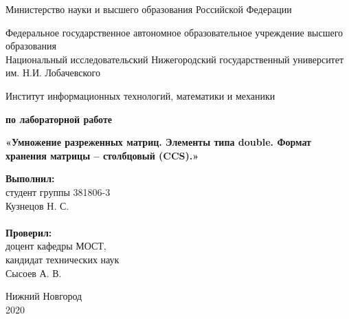 \documentclass{report}
\begin{document}
\begin{titlepage}

\begin{center}
Министерство науки и высшего образования Российской Федерации
\end{center}

\begin{center}
Федеральное государственное автономное образовательное учреждение высшего образования \\
Национальный исследовательский Нижегородский государственный университет им. Н.И. Лобачевского
\end{center}

\begin{center}
Институт информационных технологий, математики и механики
\end{center}

\vspace{4em}

\begin{center}
\textbf{ по лабораторной работе} \\
\end{center}
\begin{center}
\textbf{\Large«Умножение разреженных матриц. Элементы типа double. 
Формат хранения матрицы – столбцовый (CCS).»} \\
\end{center}

\vspace{4em}

\newbox{\lbox}
\newlength{\maxl}
\setlength{\maxl}{\wd\lbox}
\hfill\parbox{7cm}{
\hspace*{5cm}\hspace*{-5cm}\textbf{Выполнил:} \\ студент группы 381806-3 \\ Кузнецов Н. С.\\
\\
\hspace*{5cm}\hspace*{-5cm}\textbf{Проверил:}\\ доцент кафедры МОСТ, \\ кандидат технических наук \\ Сысоев А. В.\\
}
\vspace{\fill}

\begin{center} Нижний Новгород \\ 2020 \end{center}

\end{titlepage}
\end{document}
